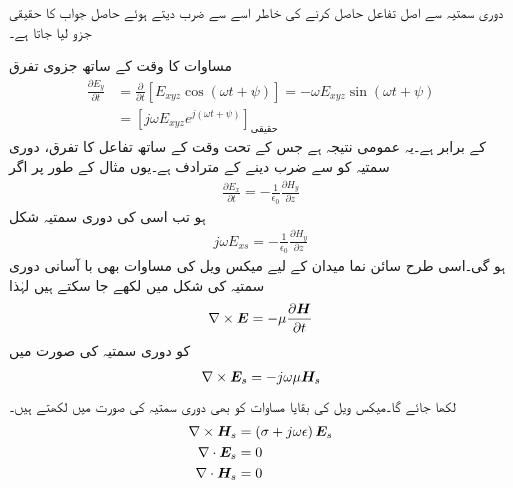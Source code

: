 دوری سمتیہ سے اصل تفاعل حاصل کرنے کی خاطر اسے  سے ضرب دیتے ہوئے حاصل جواب کا حقیقی جزو لیا جاتا ہے۔

مساوات  کا وقت کے ساتھ جزوی تفرق
\begin{align*}
\frac{\partial E_y}{\partial t}&=\frac{\partial }{\partial t} [E_{xyz} \cos(\omega t +\psi)]=-\omega E_{xyz} \sin (\omega t +\psi)\\
&=\left[j \omega  E_{xyz} e^{j(\omega t +\psi)} \right]_{\text{حقیقی}}
\end{align*} 
کے برابر ہے۔یہ عمومی نتیجہ ہے جس کے تحت وقت کے ساتھ تفاعل کا تفرق، دوری سمتیہ کو  سے ضرب دینے کے مترادف ہے۔یوں مثال کے طور پر اگر
\begin{align*}
\frac{\partial E_x}{\partial t}=-\frac{1}{\epsilon_0} \frac{\partial H_y}{\partial z}
\end{align*}
ہو تب اسی کی دوری سمتیہ شکل
\begin{align*}
j \omega E_{xs}=-\frac{1}{\epsilon_0} \frac{\partial H_y}{\partial z}
\end{align*}
ہو گی۔اسی طرح سائن نما میدان کے لیے میکس ویل کی مساوات بھی با آسانی دوری سمتیہ کی شکل میں لکھے جا سکتے ہیں لہٰذا
\begin{align*}
\nabla \times {\ensuremath{{\boldsymbol{E}}}}=-\mu\frac{\partial {\ensuremath{{\boldsymbol{H}}}}}{\partial t}
\end{align*} 
کو دوری سمتیہ کی صورت میں
\begin{align}   \label{مساوات_موج_میکس_ویل_دوری_سمتیہ_شکل_الف}
\nabla \times {\ensuremath{{\boldsymbol{E}}}}_s=-j \omega \mu {\ensuremath{{\boldsymbol{H}}}}_s
\end{align}
لکھا جائے گا۔میکس ویل کی بقایا مساوات کو بھی دوری سمتیہ کی صورت میں لکھتے ہیں۔
\begin{align}
\nabla \times {\ensuremath{{\boldsymbol{H}}}}_s &=\left(\sigma +j \omega \epsilon \right) {{\boldsymbol{E}}}_s   \label{مساوات_موج_میکس_ویل_دوری_سمتیہ_شکل_ب}\\
\nabla \cdot {\ensuremath{{\boldsymbol{E}}}}_s &=0   \label{مساوات_موج_میکس_ویل_دوری_سمتیہ_شکل_پ}\\
\nabla \cdot {\ensuremath{{\boldsymbol{H}}}}_s&=0   \label{مساوات_موج_میکس_ویل_دوری_سمتیہ_شکل_ت}
\end{align}

